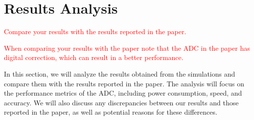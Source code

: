 \section{Results Analysis}
\label{sec:results}
\textcolor{red}{Compare your results with the results reported in the paper.}

\textcolor{red}{When comparing your results with the paper note that the ADC in the paper has digital correction, which can result in a better performance.}

In this section, we will analyze the results obtained from the simulations and compare them with the results reported in the paper. The analysis will focus on the performance metrics of the ADC, including power consumption, speed, and accuracy. We will also discuss any discrepancies between our results and those reported in the paper, as well as potential reasons for these differences.